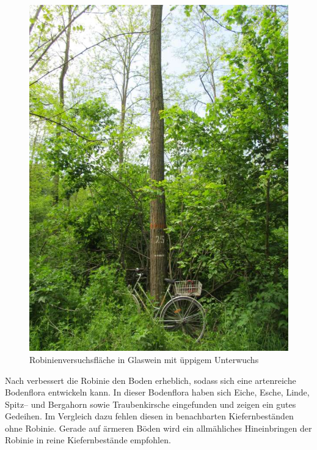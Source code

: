 \documentclass[twocolumn]{scrartcl}
\begin{document}
\begin{figure}[htbp]
  \centering
  \includegraphics[width=.9\linewidth]{./bild/GlasweinRobinie2023a}
  \caption{Robinienversuchsfläche in Glaswein mit üppigem Unterwuchs}
  \label{fig:glaswein}
\end{figure}

Nach \citet[S.~90--92]{erteld1952robinieErtrag} verbessert die Robinie
den Boden erheblich, sodass sich eine artenreiche Bodenflora
entwickeln kann. In dieser Bodenflora haben sich Eiche, Esche, Linde,
Spitz-- und Bergahorn sowie Traubenkirsche eingefunden und zeigen ein
gutes Gedeihen. Im Vergleich dazu fehlen diesen in benachbarten
Kiefernbeständen ohne Robinie. Gerade auf ärmeren Böden wird ein
allmähliches Hineinbringen der Robinie in reine Kiefernbestände
empfohlen.
\end{document}
